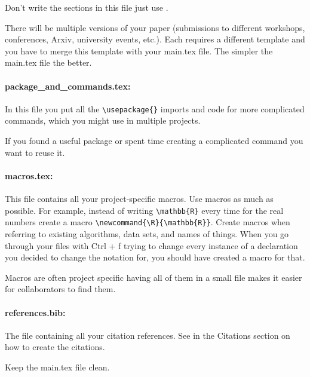 	Don't write the sections in this file just use
	 \verb||.
	
\begin{whyblock} There will be multiple versions of your paper (submissions to different workshops, conferences, Arxiv, university events, etc.). Each requires a different template and you have to merge this template with your main.tex file. The simpler the main.tex file the better.
\end{whyblock}

	\paragraph{package\_and\_commands.tex:} In this file you put all the \verb|\usepackage{}| imports and code for more complicated commands, which you might use in multiple projects.
	
	\begin{whyblock} If you found a useful package or spent time creating a complicated command you want to reuse it.
	\end{whyblock}
	
	\paragraph{macros.tex:} This file contains all your project-specific macros. Use macros as much as possible. For example, instead of writing \verb|\mathbb{R}| every time for the real numbers create a macro \verb|\newcommand{\R}{\mathbb{R}}|. Create macros when referring to existing algorithms, data sets, and names of things. When you go through your files with Ctrl + f trying to change every instance of a declaration you decided to change the notation for, you should have created a macro for that.
	
	\begin{whyblock} Macros are often project specific having all of them in a small file makes it easier for collaborators to find them.\end{whyblock}
	
	\paragraph{references.bib:} The file containing all your citation references. See in the Citations section on how to create the citations.
	
	\begin{whyblock} Keep the main.tex file clean.\end{whyblock}
	
